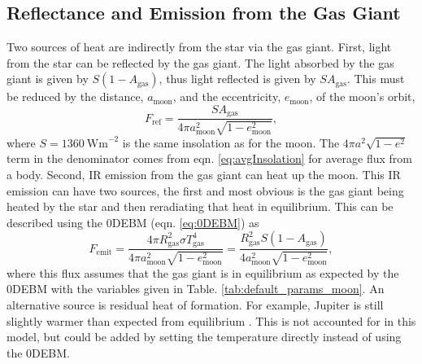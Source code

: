 \documentclass[12pt, onecolumn]{revtex4-2}    %
\newcommand{\flux}{\ensuremath{\ \text{Wm}^{-2}}}
\begin{document}
\subsection{Reflectance and Emission from the Gas Giant} \label{ssec:ref_emiss_gg}
%
Two sources of heat are indirectly from the star via the gas giant.
First, light from the star can be reflected by the gas giant.
The light absorbed by the gas giant is given by $S(1-A_\text{gas})$, thus light reflected is given by $SA_\text{gas}$.
This must be reduced by the distance, $a_\text{moon}$, and the eccentricity, $e_\text{moon}$, of the moon's orbit,
\begin{equation}
  F_\text{ref} = \frac{SA_\text{gas}}{4\pi a_\text{moon}^2 \sqrt{1-e_\text{moon}^2}},
  \label{eq:reflectance_flux}
\end{equation}
where $S = 1360 \flux$ is the same insolation as for the moon.
The $4\pi a^2\sqrt{1-e^2}$ term in the denominator comes from eqn. \eqref{eq:avgInsolation} for average flux from a body. 
Second, IR emission from the gas giant can heat up the moon.
This IR emission can have two sources, the first and most obvious is the gas giant being heated by the star and then reradiating that heat in equilibrium.
This can be described using the 0DEBM (eqn. \eqref{eq:0DEBM}) as 
\begin{equation}
    F_\text{emit} = \frac{4 \pi R_\text{gas}^2 \sigma T_\text{gas}^4}{4\pi a_\text{moon}^2 \sqrt{1-e_\text{moon}^2}}
    = \frac{R_\text{gas}^2 S(1 - A_\text{gas})}{4 a_\text{moon}^2 \sqrt{1-e_\text{moon}^2}},
    \label{eq:emission_flux}
\end{equation}
where this flux assumes that the gas giant is in equilibrium as expected by the 0DEBM with the variables given in Table. \ref{tab:default_params_moon}.
An alternative source is residual heat of formation.
For example, Jupiter is still slightly warmer than expected from equilibrium \cite{LJW2018}.
This is not accounted for in this model, but could be added by setting the temperature directly instead of using the 0DEBM.
\end{document}
